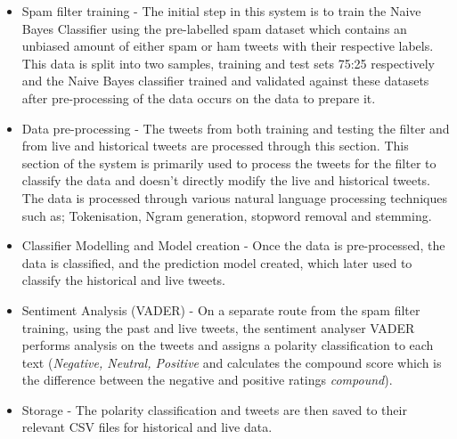 \documentclass[oneside, 12pt]{article}
\begin{document}
		\begin{itemize}
			\item Spam filter training - The initial step in this system is to train the Naive Bayes Classifier using the pre-labelled spam dataset which contains an unbiased amount of either spam or ham tweets with their respective labels.
			\subitem This data is split into two samples, training and test sets 75:25 respectively and the Naive Bayes classifier trained and validated against these datasets after pre-processing of the data occurs on the data to prepare it.
			\item Data pre-processing - The tweets from both training and testing the filter and from live and historical tweets are processed through this section. 
			\subitem This section of the system is primarily used to process the tweets for the filter to classify the data and doesn't directly modify the live and historical tweets. The data is processed through various natural language processing techniques such as; Tokenisation, Ngram generation, stopword removal and stemming.
			\item Classifier Modelling and Model creation - Once the data is pre-processed, the data is classified, and the prediction model created, which later used to classify the historical and live tweets.
			\item Sentiment Analysis (VADER) - On a separate route from the spam filter training, using the past and live tweets, the sentiment analyser VADER performs analysis on the tweets and assigns a polarity classification to each text (\textit{Negative, Neutral, Positive} and calculates the compound score which is the difference between the negative and positive ratings \textit{compound}).
			\item Storage - The polarity classification and tweets are then saved to their relevant CSV files for historical and live data.
		\end{itemize}
	
\end{document}
